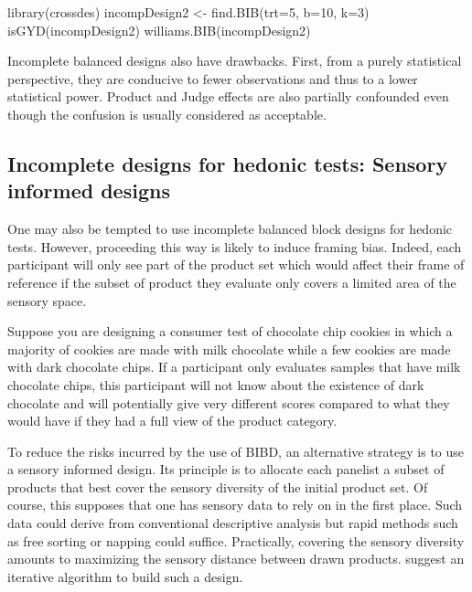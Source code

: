 \documentclass[
]{krantz}
\makeatletter
\newenvironment{Shaded}{\begin{snugshade}}{\end{snugshade}}
\newcommand{\AttributeTok}[1]{\textcolor[rgb]{0.61,0.61,0.61}{#1}}
\newcommand{\DecValTok}[1]{\textcolor[rgb]{0.06,0.06,0.06}{#1}}
\newcommand{\FunctionTok}[1]{\textcolor[rgb]{0,0,0}{#1}}
\newcommand{\NormalTok}[1]{#1}
\newcommand{\OtherTok}[1]{\textcolor[rgb]{0.37,0.37,0.37}{#1}}
\newenvironment{kframe}{%
\medskip{}
\setlength{\fboxsep}{.8em}
 \def\at@end@of@kframe{}%
 \ifinner\ifhmode%
  \def\at@end@of@kframe{\end{minipage}}%
  \begin{minipage}{\columnwidth}%
 \fi\fi%
 \def\FrameCommand##1{\hskip\@totalleftmargin \hskip-\fboxsep
 \colorbox{shadecolor}{##1}\hskip-\fboxsep
     \hskip-\linewidth \hskip-\@totalleftmargin \hskip\columnwidth}%
 \MakeFramed {\advance\hsize-\width
   \@totalleftmargin\z@ \linewidth\hsize
   \@setminipage}}%
 {\par\unskip\endMakeFramed%
 \at@end@of@kframe}
\renewenvironment{Shaded}{\begin{kframe}}{\end{kframe}}
\makeatother
\begin{document}
\begin{Shaded}
\begin{Highlighting}[]
\FunctionTok{library}\NormalTok{(crossdes)}
\NormalTok{incompDesign2 }\OtherTok{\textless{}{-}} \FunctionTok{find.BIB}\NormalTok{(}\AttributeTok{trt=}\DecValTok{5}\NormalTok{, }\AttributeTok{b=}\DecValTok{10}\NormalTok{, }\AttributeTok{k=}\DecValTok{3}\NormalTok{)}
\FunctionTok{isGYD}\NormalTok{(incompDesign2)}
\FunctionTok{williams.BIB}\NormalTok{(incompDesign2)}
\end{Highlighting}
\end{Shaded}

Incomplete balanced designs also have drawbacks. First, from a purely statistical perspective, they are conducive to fewer observations and thus to a lower statistical power. Product and Judge effects are also partially confounded even though the confusion is usually considered as acceptable.

\hypertarget{incomplete-designs-for-hedonic-tests-sensory-informed-designs}{%
\subsection{Incomplete designs for hedonic tests: Sensory informed designs}\label{incomplete-designs-for-hedonic-tests-sensory-informed-designs}}

One may also be tempted to use incomplete balanced block designs for hedonic tests. However, proceeding this way is likely to induce framing bias. Indeed, each participant will only see part of the product set which would affect their frame of reference if the subset of product they evaluate only covers a limited area of the sensory space.

Suppose you are designing a consumer test of chocolate chip cookies in which a majority of cookies are made with milk chocolate while a few cookies are made with dark chocolate chips. If a participant only evaluates samples that have milk chocolate chips, this participant will not know about the existence of dark chocolate and will potentially give very different scores compared to what they would have if they had a full view of the product category.

To reduce the risks incurred by the use of BIBD, an alternative strategy is to use a sensory informed design. Its principle is to allocate each panelist a subset of products that best cover the sensory diversity of the initial product set. Of course, this supposes that one has sensory data to rely on in the first place. Such data could derive from conventional descriptive analysis but rapid methods such as free sorting or napping could suffice.
Practically, covering the sensory diversity amounts to maximizing the sensory distance between drawn products. \citet{Franczak2015} suggest an iterative algorithm to build such a design.
\end{document}
